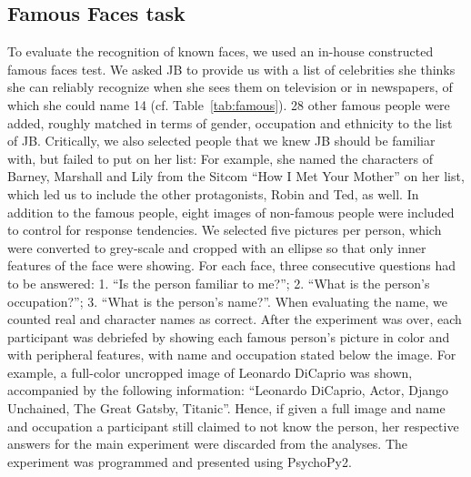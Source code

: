 \documentclass[fleqn,10pt]{SelfArx} %
\begin{document}
\subsection*{Famous Faces task}
To evaluate the recognition of known faces, we used an in-house constructed famous faces test. We asked JB to provide us with a list of celebrities she thinks she can reliably recognize when she sees them on television or in newspapers, of which she could name 14 (cf. Table~\ref{tab:famous}). 28 other famous people were added, roughly matched in terms of gender, occupation and ethnicity to the list of JB. Critically, we also selected people that we knew JB should be familiar with, but failed to put on her list: For example, she named the characters of Barney, Marshall and Lily from the Sitcom “How I Met Your Mother” on her list, which led us to include the other protagonists, Robin and Ted, as well. In addition to the famous people, eight images of non-famous people were included to control for response tendencies. We selected five pictures per person, which were converted to grey-scale and cropped with an ellipse so that only inner features of the face were showing.
For each face, three consecutive questions had to be answered: 1. “Is the person familiar to me?”; 2. “What is the person's occupation?”; 3. “What is the person's name?”. When evaluating the name, we counted real and character names as correct. After the experiment was over, each participant was debriefed by showing each famous person's picture in color and with peripheral features, with name and occupation stated below the image. For example, a full-color uncropped image of Leonardo DiCaprio was shown, accompanied by the following information: “Leonardo DiCaprio, Actor, Django Unchained, The Great Gatsby, Titanic”. Hence, if given a full image and name and occupation a participant still claimed to not know the person, her respective answers for the main experiment were discarded from the analyses. The experiment was programmed and presented using PsychoPy2.
\end{document}
